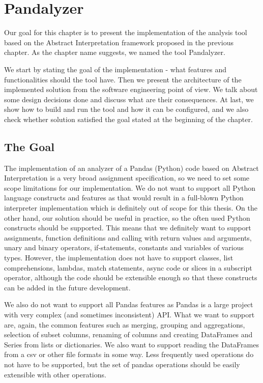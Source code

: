 \chapter{Pandalyzer}

Our goal for this chapter is to present the implementation of the analysis tool based on the Abstract Interpretation
framework proposed in the previous chapter.
As the chapter name suggests, we named the tool Pandalyzer.

We start by stating the goal of the implementation - what features and functionalities should the tool have.
Then we present the architecture of the implemented solution from the software engineering point of view.
We talk about some design decisions done and discuss what are their consequences.
At last, we show how to build and run the tool and how it can be configured, and we also check whether solution satisfied
the goal stated at the beginning of the chapter.


\section{The Goal}

The implementation of an analyzer of a Pandas (Python) code based on Abstract Interpretation is a very
broad assignment specification, so we need to set some scope limitations for our implementation.
We do not want to support all Python language constructs and features as that would result in a full-blown Python
interpreter implementation which is definitely out of scope for this thesis.
On the other hand, our solution should be useful in practice, so the often used Python constructs should be supported.
This means that we definitely want to support assignments, function definitions and calling with return values and
arguments, unary and binary operators, if-statements, constants and variables of various types.
However, the implementation does not have to support classes, list comprehensions, lambdas, match statements, async code
or slices in a subscript operator, although the code should be extensible enough so that these constructs can be added
in the future development.


We also do not want to support all Pandas features as Pandas is a large project with very complex
(and sometimes inconsistent) API\@.
What we want to support are, again, the common features such as merging, grouping and aggregations, selection of
subset columns, renaming of columns and creating DataFrames and Series from lists or dictionaries.
We also want to support reading the DataFrames from a csv or other file formats in some way.
Less frequently used operations do not have to be supported, but the set of pandas operations should be easily
extensible with other operations.

